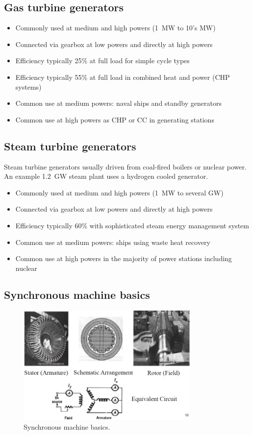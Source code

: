 \subsection{Gas turbine generators}
\begin{itemize}
    \item Commonly used at medium and high powers (\SI{1}{\mega\watt} to 10's \si{\mega\watt})
    \item Connected via gearbox at low powers and directly at high powers
    \item Efficiency typically 25\% at full load for simple cycle types
    \item Efficiency typically 55\% at full load in combined heat and power (CHP systems)
    \item Common use at medium powers: naval ships and standby generators
    \item Common use at high powers as CHP or CC in generating stations
\end{itemize}
\subsection{Steam turbine generators}
Steam turbine generators usually driven from coal-fired boilers or nuclear power. An example \SI{1.2}{\giga\watt} steam plant uses a hydrogen cooled generator.
\begin{itemize}
    \item Commonly used at medium and high powers (\SI{1}{\mega\watt} to several \si{\giga\watt})
    \item Connected via gearbox at low powers and directly at high powers
    \item Efficiency typically 60\% with sophisticated steam energy management system
    \item Common use at medium powers: ships using waste heat recovery
    \item Common use at high powers in the majority of power stations including nuclear
\end{itemize}
\subsection{Synchronous machine basics}
\begin{figure}[H]
    \centering
    \includegraphics[width = 0.8\textwidth]{img/figure74.png}
    \caption{Synchronous machine basics.}
\end{figure}
